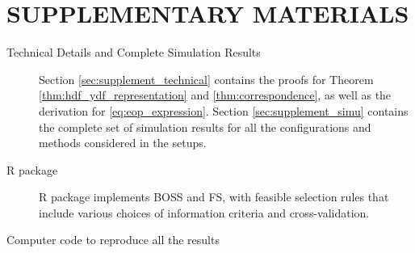 \section{SUPPLEMENTARY MATERIALS}
\begin{description}

\item[Technical Details and Complete Simulation Results] Section \ref{sec:supplement_technical} contains the proofs for Theorem \ref{thm:hdf_ydf_representation} and \ref{thm:correspondence}, as well as the derivation for \eqref{eq:eop_expression}.
Section \ref{sec:supplement_simu} contains the complete set of simulation results for all the configurations and methods considered in the setups.

\item[R package] R package  implements BOSS and FS, with feasible selection rules that include various choices of information criteria and cross-validation.

\item[Computer code to reproduce all the results] 

\end{description}